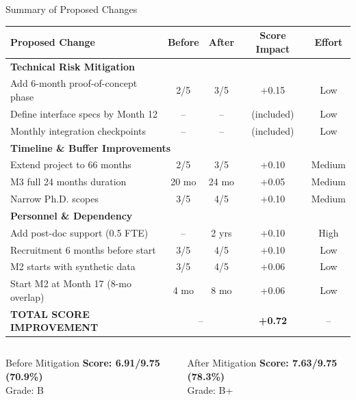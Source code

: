 \documentclass[aspectratio=169]{beamer}
\begin{document}
\begin{frame}{Summary of Proposed Changes}
\vspace{-0.6cm}

\begin{center}
\scriptsize
\begin{tabular}{|p{4.5cm}|c|c|c|c|}
\hline
\rowcolor{primary!20}
\textbf{Proposed Change} & \textbf{Before} & \textbf{After} & \textbf{Score Impact} & \textbf{Effort} \\
\hline
\multicolumn{5}{|l|}{\cellcolor{primary!10}\textbf{Technical Risk Mitigation}} \\
\hline
Add 6-month proof-of-concept phase & 2/5 & 3/5 & +0.15 & Low \\
\hline
Define interface specs by Month 12 & -- & -- & (included) & Low \\
\hline
Monthly integration checkpoints & -- & -- & (included) & Low \\
\hline
\multicolumn{5}{|l|}{\cellcolor{primary!10}\textbf{Timeline \& Buffer Improvements}} \\
\hline
Extend project to 66 months & 2/5 & 3/5 & +0.10 & Medium \\
\hline
M3 full 24 months duration & 20 mo & 24 mo & +0.05 & Medium \\
\hline
Narrow Ph.D. scopes & 3/5 & 4/5 & +0.10 & Medium \\
\hline
\multicolumn{5}{|l|}{\cellcolor{primary!10}\textbf{Personnel \& Dependency}} \\
\hline
Add post-doc support (0.5 FTE) & -- & 2 yrs & +0.10 & High \\
\hline
Recruitment 6 months before start & 3/5 & 4/5 & +0.10 & Low \\
\hline
M2 starts with synthetic data & 3/5 & 4/5 & +0.06 & Low \\
\hline
Start M2 at Month 17 (8-mo overlap) & 4 mo & 8 mo & +0.06 & Low \\
\hline
\rowcolor{accent1!20}
\textbf{TOTAL SCORE IMPROVEMENT} & \multicolumn{2}{c|}{--} & \textbf{+0.72} & -- \\
\hline
\end{tabular}
\end{center}


\begin{columns}[T]
\scriptsize
\begin{block}{\scriptsize Before Mitigation}
\centering
\textbf{Score: 6.91/9.75 (70.9\%)}\\
Grade: B
\end{block}

\scriptsize
\begin{block}{\scriptsize After Mitigation}
\centering
\textbf{Score: 7.63/9.75 (78.3\%)}\\
Grade: B+
\end{block}
\end{columns}

\end{frame}
\end{document}
